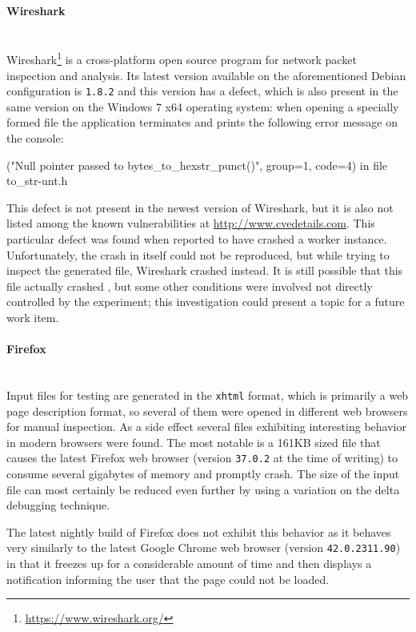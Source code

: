 \paragraph{Wireshark} ~\\
Wireshark\footnote{\url{https://www.wireshark.org/}} is a cross-platform open source program for network packet
inspection and analysis. Its latest version available on the aforementioned Debian configuration is
\texttt{1.8.2} and this version has a defect, which is also present in the same version on the
Windows 7 x64 operating system: when opening a specially formed \pcap file the application terminates and
prints the following error message on the console:

{\small ("Null pointer passed to bytes\_to\_hexstr\_punct()", group=1, code=4) in file to\_str-unt.h}

This defect is not present in the newest version of Wireshark, but it is also not listed among the known
vulnerabilities at \url{http://www.cvedetails.com}. This particular defect was found when \xmlmate reported to
have crashed a \libpcap worker instance. Unfortunately, the crash in \libpcap itself could not be reproduced,
but while trying to inspect the generated \pcap file, Wireshark crashed instead. It is still possible that
this file actually crashed \libpcap, but some other conditions were involved not directly controlled by the
experiment; this investigation could present a topic for a future work item.
\paragraph{Firefox} ~\\
Input files for testing \libxml are generated in the \texttt{xhtml} format, which is primarily a web page
description format, so several of them were opened in different web browsers for manual inspection. As a side
effect several files exhibiting interesting behavior in modern browsers were found. The most notable is a 161KB
sized file that causes the latest Firefox web browser (version \texttt{37.0.2} at the time of writing) to
consume several gigabytes of memory and promptly crash. The size of the input file can most certainly be
reduced even further by using a variation on the delta debugging technique\cite{zeller2002simplifying}. 

The latest nightly build of Firefox does not exhibit this behavior as it behaves very similarly to the 
latest Google Chrome web browser (version \texttt{42.0.2311.90}) in that it freezes up for a
considerable amount of time and then displays a notification informing the user that the page could not be
loaded.

